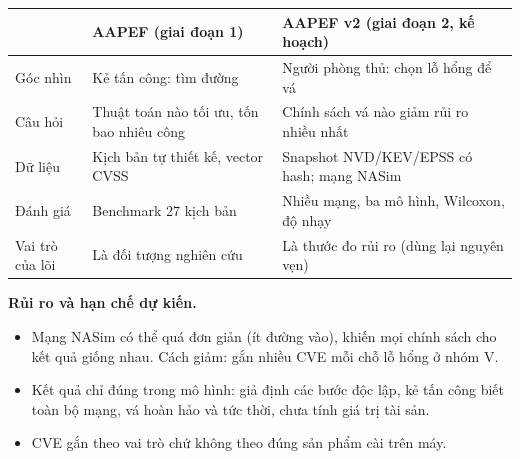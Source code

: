 \documentclass[11pt,a4paper]{article}
\begin{document}
\begin{center}
\begin{tabular}{@{}Y{3cm}Y{5.8cm}Y{6.2cm}@{}}
\toprule
& AAPEF (giai đoạn 1) & AAPEF v2 (giai đoạn 2, kế hoạch) \\
\midrule
Góc nhìn & Kẻ tấn công: tìm đường & Người phòng thủ: chọn lỗ hổng để vá \\
Câu hỏi & Thuật toán nào tối ưu, tốn bao nhiêu công & Chính sách vá nào giảm rủi ro nhiều nhất \\
Dữ liệu & Kịch bản tự thiết kế, vector CVSS & Snapshot NVD/KEV/EPSS có hash; mạng NASim \\
Đánh giá & Benchmark 27 kịch bản & Nhiều mạng, ba mô hình, Wilcoxon, độ nhạy \\
Vai trò của lõi & Là đối tượng nghiên cứu & Là thước đo rủi ro (dùng lại nguyên vẹn) \\
\bottomrule
\end{tabular}
\end{center}

\textbf{Rủi ro và hạn chế dự kiến.}
\begin{itemize}
  \item Mạng NASim có thể quá đơn giản (ít đường vào), khiến mọi chính sách cho kết quả giống nhau. Cách giảm: gắn nhiều CVE mỗi chỗ lỗ hổng ở nhóm V.
  \item Kết quả chỉ đúng trong mô hình: giả định các bước độc lập, kẻ tấn công biết toàn bộ mạng, vá hoàn hảo và tức thời, chưa tính giá trị tài sản.
  \item CVE gắn theo vai trò chứ không theo đúng sản phẩm cài trên máy.
\end{itemize}
\end{document}
